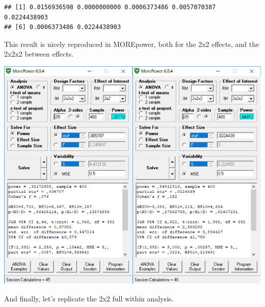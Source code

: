 \documentclass[]{book}
\newenvironment{Shaded}{\begin{snugshade}}{\end{snugshade}}
\newcommand{\NormalTok}[1]{#1}
\newcommand{\OperatorTok}[1]{\textcolor[rgb]{0.81,0.36,0.00}{\textbf{#1}}}
\begin{document}
\begin{Shaded}
\end{Shaded}

\begin{verbatim}
## [1] 0.0156936598 0.0000000000 0.0006373486 0.0057070387 0.0224438903
## [6] 0.0006373486 0.0224438903
\end{verbatim}

This result is nicely reproduced in MOREpower, both for the 2x2 effects, and the 2x2x2 between effects.

\includegraphics{screenshots/morepower_5.png}

And finally, let's replicate the 2x2 full within analysis.
\end{document}
